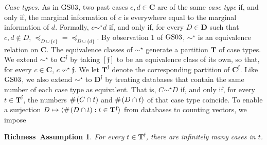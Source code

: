 \documentclass[ecta,nameyear,draft]{econsocart}
\newcommand{\countof}{\mathbin{\#}\hskip1pt}
\newcommand{\novel}{\mathfrak f}
\newcommand{\preceqb}{\mathbin{\preceq}}
\newcommand{\mbbd}{{\mathbf D}}
\newcommand{\mbbdp}{{\mathbf D^{\novel}}}
\newcommand{\mbbc}{{\mathbf C}}
\newcommand{\mbbcp}{{\mathbf C^{\novel}}}
\newcommand{\mbbt}{{\mathbf {T}}}
\newcommand{\mbbtp}{{\mathbf{T}^\novel}}
\newcommand{\gsii}{$\textup{GS03}$}
\theoremstyle{plain}
\newtheorem*{assumption*}{Richness~Assumption}
\theoremstyle{remark}
\begin{document}



\emph{Case types.} As in \gsii, two past cases $c , d \in \mbbc$ are of the
same \emph{case type} if, and only if, the marginal information of
$c$ is everywhere equal to the marginal information of $d$. Formally, $c \sim
^{\star} d$ if, and only if, for every $D \in \mbbd$ such that $c , d \notin
D$, $\preceqb _ {D \cup \{c \}} = \preceqb _ {D \cup \{d \}}$.  By
observation 1 of \gsii, $\sim^{\star}$ is an equivalence relation on
$\mbbc$. The equivalence classes of $\sim^\star$ generate a partition $\mbbt$
of case types.  We extend $\sim^{\star}$ to $\mbbcp$ by taking $[ \novel ]$ to
be an equivalence class of its own, so that, for every $c \in \mbbc$, $c
\nsim^{ \star} \novel$.  We let $\mbbtp$ denote the corresponding partition of
$\mbbcp$.  Like \gsii, we also extend $\sim^{\star}$ to $\mbbdp$ by treating
databases that contain the same number of each case type as equivalent. That
is, $C \sim^{\star} D$ if, and only if, for every $t \in \mbbtp$, the numbers
$\countof (C \cap t)$ and $\countof (D \cap t)$ of that case type coincide. To
enable a surjection $D \mapsto \langle\countof (D \cap t): t \in \mbbtp
\rangle$ from databases to counting vectors, we impose
\begin{assumption*}
  For every  $t \in \mbbtp$, there are infinitely many cases in $t$.
\end{assumption*}

\end{document}
